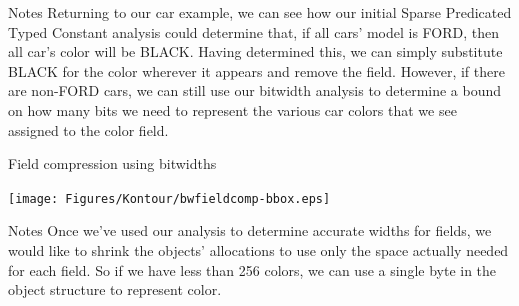 \documentclass[%
pdf,
colorBG,
slideColor,
nototal,
oqe
]{prosper}
\newenvironment{talknotes}{\begin{slide}{Notes}\tiny}{\end{slide}}
\begin{document}
\begin{talknotes}
Returning to our car example, we can see how our initial Sparse
Predicated Typed Constant analysis could determine that, if all cars'
model is FORD, then all car's color will be BLACK.  Having determined
this, we can simply substitute BLACK for the color wherever it appears
and remove the field.  However, if there are non-FORD cars, we can
still use our bitwidth analysis to determine a bound on how many
bits we need to represent the various car colors that we see assigned
to the color field.
\end{talknotes}

\begin{slide}{Field compression using bitwidths}

\begin{center}
\vspace{1cm}
\texttt{[image: Figures/Kontour/bwfieldcomp-bbox.eps]}
\end{center}
\end{slide}

\begin{talknotes}
Once we've used our analysis to determine accurate widths for fields,
we would like to shrink the objects' allocations to use only the space
actually needed for each field.  So if we have less than 256 colors,
we can use a single byte in the object structure to represent color.
\end{talknotes}

\end{document}
